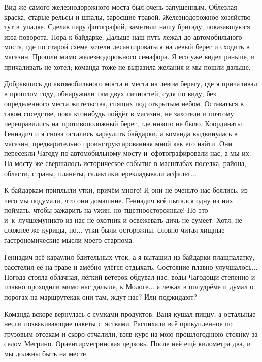 Вид же самого железнодорожного моста был очень запущенным. Облезлая краска, старые рельсы и шпалы, заросшие травой. Железнодорожное хозяйство тут в~упадке. Сделав пару фотографий, заметили нашу бригаду, показавшуюся из\sdash за поворота. Пора к байдарке. Дальше наш путь лежал до автомобильного моста, где по старой схеме хотели десантироваться на левый берег и сходить в магазин. Прошли мимо железнодорожного семафора. Я его уже видел раньше, и причаливать не хотел; команда тоже не выразила желания и мы пошли дальше. 

Добравшись до автомобильного моста и места на левом берегу, где я причаливал в прошлом году, обнаружили там двух личностей, судя по виду, без определенного места жительства, спящих под открытым небом. Оставаться в таком соседстве, пока кто\sdash нибудь пойдёт в магазин, не захотели и поэтому переправились на~противоположный берег, где никого не было. Координаты\mdash \CoordsChagodoschaSixteenGoToStore. Геннадич и я снова остались караулить байдарки, а команда выдвинулась в магазин, предварительно проинструктированная мной как его найти. Они пересекли Чагоду по автомобильному мосту и~сфотографировали нас, а мы их. На мосту же свершалось историческое событие в масштабах посёлка, района, области, страны, планеты, галактики\mdash  перекладывали асфальт$\ldots$ 

К байдаркам приплыли утки, причём много! И они не очень\sdash то нас боялись, из чего мы подумали, что они домашние. Геннадич всё пытался одну из них поймать, чтобы зажарить на ужин, но тщетно\mdash осторожные! Но это и~к~лучшему\mdash никто из нас не охотник и освежевать дичь не сумеет. Хотя, не сложнее же курицы, но$\ldots$ утки были осторожны, словно читая хищные гастрономические мысли моего старпома.

Геннадич всё караулил бдительных уток, а я вытащил из байдарки плащ\sdash палатку, расстелил её на траве и амёбно улёгся отдыхать. Состояние плавно улучшалось$\ldots$ Погода стояла облачная, лёгкий ветерок обдувал нас, в\'{о}ды Чагодощи степенно и плавно проходили мимо нас дальше, к Мологе$\ldots$ я лежал в полудрёме и думал о порогах на маршруте\mdash как они там, ждут нас? Или поджидают?

Команда вскоре вернулась с сумками продуктов. Ваня кушал пиццу, а остальные несли позвякивающие пакеты с~яствами. Распихали всё прикупленное по грузовым отсекам и скоро отчалили, взяв курс на мою прошлогоднюю стоянку за селом Мегрино. Ориентир\mdash мегринская церковь. После неё ещё километра два, и мы должны быть на месте.

